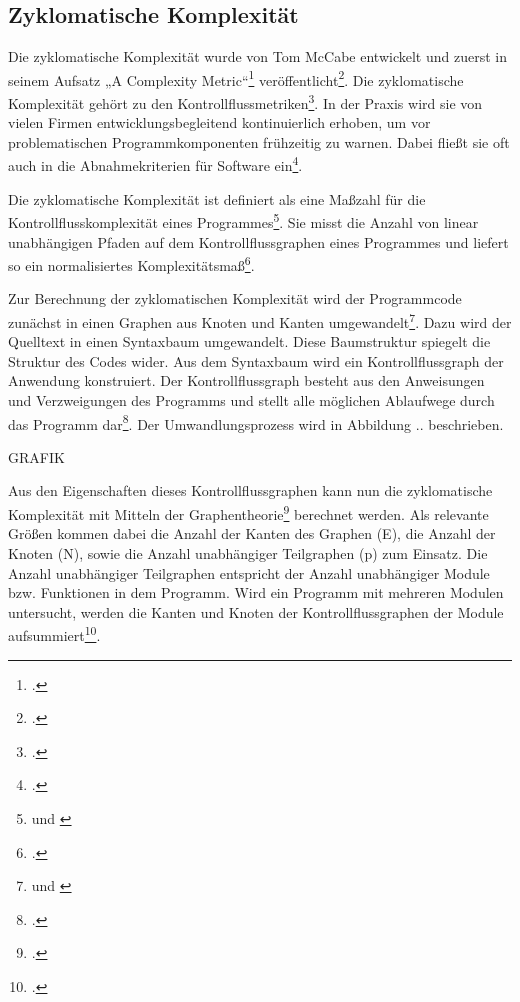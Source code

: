 \subsection{Zyklomatische Komplexität}\label{Zyklomatische-Komplexitat}

Die zyklomatische Komplexität wurde von Tom McCabe entwickelt und zuerst
in seinem Aufsatz „A Complexity Metric``\footcite[Vgl. ][]{mccabeComplexityMeasure1976}
veröffentlicht\footcite[Vgl. ][S. 185]{sneedSoftwareZahlenVermessung2010}. Die zyklomatische
Komplexität gehört zu den Kontrollflussmetriken\footcite[Vgl. ][S. 88]{ebertSoftwareMetrikenPraxisEinfuhrung1996}. In der Praxis wird sie von vielen Firmen
entwicklungsbegleitend kontinuierlich erhoben, um vor problematischen
Programmkomponenten frühzeitig zu warnen. Dabei fließt sie oft auch in
die Abnahmekriterien für Software ein\footcite[Vgl. ][S. 275]{hoffmannSoftwareQualitat2013}.

Die zyklomatische Komplexität ist definiert als eine Maßzahl für die
Kontrollflusskomplexität eines Programmes\footnote{\cite[Vgl. ][S. 2]{rumreichExaminingSoftwareDesign2019} und \cite[S. 335]{jonesAppliedSoftwareMeasurement2008}}. Sie misst die Anzahl von linear
unabhängigen Pfaden auf dem Kontrollflussgraphen eines Programmes und
liefert so ein normalisiertes Komplexitätsmaß\footcite[Vgl. ][S. 2]{rumreichExaminingSoftwareDesign2019}.

Zur Berechnung der zyklomatischen Komplexität wird der Programmcode
zunächst in einen Graphen aus Knoten und Kanten umgewandelt\footnote{\cite[Vgl. ][S. 185]{sneedSoftwareZahlenVermessung2010} und \cite[S. 335]{jonesAppliedSoftwareMeasurement2008}}. Dazu wird der Quelltext in einen
Syntaxbaum umgewandelt. Diese Baumstruktur spiegelt die Struktur des
Codes wider. Aus dem Syntaxbaum wird ein Kontrollflussgraph der
Anwendung konstruiert. Der Kontrollflussgraph besteht aus den
Anweisungen und Verzweigungen des Programms und stellt alle möglichen
Ablaufwege durch das Programm dar\footcite[Vgl. ][]{rackeKontrollflussdiagramme2017}.
Der Umwandlungsprozess wird in Abbildung .. beschrieben.

GRAFIK

Aus den Eigenschaften dieses Kontrollflussgraphen kann nun die
zyklomatische Komplexität mit Mitteln der Graphentheorie\footcite[Vgl. ][S. 273]{hoffmannSoftwareQualitat2013} berechnet werden. Als relevante Größen kommen dabei die
Anzahl der Kanten des Graphen (E), die Anzahl der Knoten (N), sowie die
Anzahl unabhängiger Teilgraphen (p) zum Einsatz. Die Anzahl unabhängiger
Teilgraphen entspricht der Anzahl unabhängiger Module bzw. Funktionen in
dem Programm. Wird ein Programm mit mehreren Modulen untersucht, werden
die Kanten und Knoten der Kontrollflussgraphen der Module
aufsummiert\footcite[Vgl. ][S. 275f]{hoffmannSoftwareQualitat2013}.

